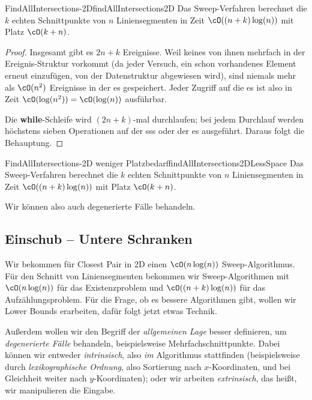 \documentclass[language=ngerman,algolist,acrolist]{TemplateLecture}
\begin{document}
\begin{thm}{FindAllIntersections-2D}{findAllIntersections2D}
    Das Sweep-Verfahren berechnet die $k$ echten Schnittpunkte von $n$ Liniensegmenten in Zeit $\cO((n + k) \log(n))$ mit Platz $\cO(k + n)$.
\end{thm}

\begin{proof}
    Insgesamt gibt es $2n+k$ Ereignisse. Weil keines von ihnen mehrfach in der Ereignis-Struktur vorkommt (da jeder Versuch, ein schon vorhandenes Element erneut einzufügen, von der Datenstruktur abgewiesen wird), sind niemals mehr als $\cO(n^2)$ Ereignisse in der \ac{es} gespeichert. Jeder Zugriff auf die \ac{es} ist also in Zeit $\cO(\log(n^2)) = \cO(\log(n))$ ausführbar.
    
    Die \textbf{while}-Schleife wird $(2n + k)$-mal durchlaufen; bei jedem Durchlauf werden höchstens sieben Operationen auf der \ac{sss} oder der \ac{es} ausgeführt. Daraus folgt die Behauptung.
\end{proof}

\begin{thm}{FindAllIntersections-2D weniger Platzbedarf}{findAllIntersections2DLessSpace}
    Das Sweep-Verfahren berechnet die $k$ echten Schnittpunkte von $n$ Liniensegmenten in Zeit $\cO((n + k) \log(n))$ mit Platz $\cO(k + n)$.
\end{thm}

Wir können also auch degenerierte Fälle behandeln.


\subsection{Einschub -- Untere Schranken}

Wir bekommen für Closest Pair in 2D einen $\cO(n \log(n))$ Sweep-Algorithmus. Für den Schnitt von Liniensegmenten bekommen wir Sweep-Algorithmen mit $\cO(n \log(n))$ für das Existenzproblem und $\cO((n + k) \log(n))$ für das Aufzählungsproblem. Für die Frage, ob es bessere Algorithmen gibt, wollen wir Lower Bounds erarbeiten, dafür folgt jetzt etwas Technik.

Außerdem wollen wir den Begriff der \emph{allgemeinen Lage} besser definieren, um \emph{degenerierte Fälle} behandeln, beispielsweise Mehrfachschnittpunkte. Dabei können wir entweder \emph{intrinsisch}, also \emph{im} Algorithmus stattfinden (beispielsweise durch \emph{lexikographische Ordnung}, also Sortierung nach $x$-Koordinaten, und bei Gleichheit weiter nach $y$-Koordinaten); oder wir arbeiten \emph{extrinsisch}, das heißt, wir manipulieren die Eingabe.
\end{document}

